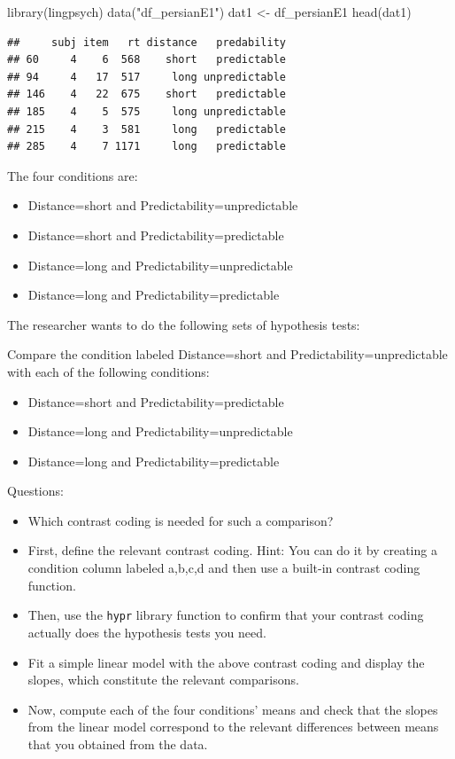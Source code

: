\documentclass[
  12pt,
]{krantz}
\newenvironment{Shaded}{\begin{snugshade}}{\end{snugshade}}
\newcommand{\FunctionTok}[1]{\textcolor[rgb]{0.00,0.00,0.00}{#1}}
\newcommand{\NormalTok}[1]{#1}
\newcommand{\OtherTok}[1]{\textcolor[rgb]{0.56,0.35,0.01}{#1}}
\newcommand{\StringTok}[1]{\textcolor[rgb]{0.31,0.60,0.02}{#1}}
\providecommand{\tightlist}{%
  \setlength{\itemsep}{0pt}\setlength{\parskip}{0pt}}
\theoremstyle{definition}
\theoremstyle{definition}
\theoremstyle{definition}
\theoremstyle{definition}
\theoremstyle{remark}
\begin{document}
\begin{Shaded}
\begin{Highlighting}[]
\FunctionTok{library}\NormalTok{(lingpsych)}
\FunctionTok{data}\NormalTok{(}\StringTok{"df\_persianE1"}\NormalTok{)}
\NormalTok{dat1 }\OtherTok{\textless{}{-}}\NormalTok{ df\_persianE1}
\FunctionTok{head}\NormalTok{(dat1)}
\end{Highlighting}
\end{Shaded}

\begin{verbatim}
##     subj item   rt distance   predability
## 60     4    6  568    short   predictable
## 94     4   17  517     long unpredictable
## 146    4   22  675    short   predictable
## 185    4    5  575     long unpredictable
## 215    4    3  581     long   predictable
## 285    4    7 1171     long   predictable
\end{verbatim}

The four conditions are:

\begin{itemize}
\tightlist
\item
  Distance=short and Predictability=unpredictable
\item
  Distance=short and Predictability=predictable
\item
  Distance=long and Predictability=unpredictable
\item
  Distance=long and Predictability=predictable
\end{itemize}

The researcher wants to do the following sets of hypothesis tests:

Compare the condition labeled Distance=short and Predictability=unpredictable with each of the following conditions:

\begin{itemize}
\tightlist
\item
  Distance=short and Predictability=predictable
\item
  Distance=long and Predictability=unpredictable
\item
  Distance=long and Predictability=predictable
\end{itemize}

Questions:

\begin{itemize}
\tightlist
\item
  Which contrast coding is needed for such a comparison?
\item
  First, define the relevant contrast coding. Hint: You can do it by creating a condition column labeled a,b,c,d and then use a built-in contrast coding function.
\item
  Then, use the \texttt{hypr} library function to confirm that your contrast coding actually does the hypothesis tests you need.
\item
  Fit a simple linear model with the above contrast coding and display the slopes, which constitute the relevant comparisons.
\item
  Now, compute each of the four conditions' means and check that the slopes from the linear model correspond to the relevant differences between means that you obtained from the data.
\end{itemize}
\end{document}

